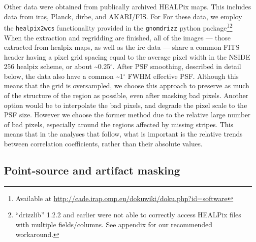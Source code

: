 		  Other data were obtained from publically archived HEALPix maps. This includes data from \gls{iras}, Planck, \gls{dirbe}, and AKARI/FIS. For For these data, we employ the {\tt healpix2wcs} functionality provided in the {\tt gnomdrizz} python package\footnote{Available at \url{http://cade.irap.omp.eu/dokuwiki/doku.php?id=software}}\footnote{``drizzlib'' 1.2.2 and earlier were not able to correctly access HEALPix files with multiple fields/columns. See appendix for our recommended workaround.}   When the extraction and regridding are finished, all of the images --- those extracted from \gls{healpix} maps, as well as the \gls{irc} data --- share a common FITS header having a pixel grid spacing equal to the average pixel width in the NSIDE 256 \gls{healpix} scheme, or about \textasciitilde{0.25$^{\circ{}}$}. After PSF smoothing, described in detail below, the data also have a common \textasciitilde{1$^{\circ{}}$} FWHM effective PSF. Although this means that the grid is oversampled, we choose this approach to preserve as much of the structure of the region as possible, even after masking bad pixels. Another option would be to interpolate the bad pixels, and degrade the pixel scale to the PSF size. However we choose the former method due to the relative large number of bad pixels, especially around the regions affected by missing stripes. This means that in the analyses that follow, what is important is the relative trends between correlation coefficients, rather than their absolute values.

      \subsection{Point-source and artifact masking}

